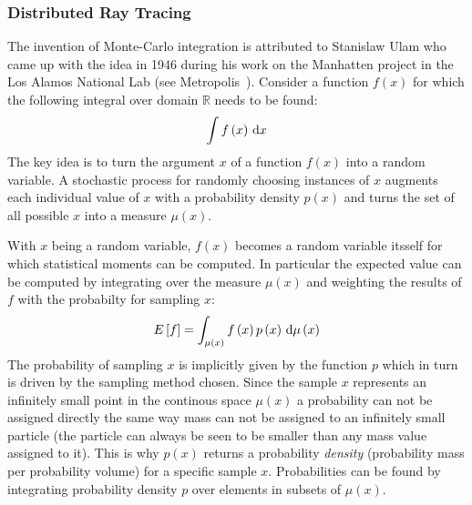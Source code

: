 \subsubsection*{Distributed Ray Tracing}

The invention of Monte-Carlo integration is attributed to Stanislaw Ulam who came up with the idea in 1946 during his work on the Manhatten project in the Los Alamos National Lab (see Metropolis~\cite{Metropolis49, Metropolis87}). Consider a function $f\left(x\right)$ for which the following integral over domain $\mathbb{R}$ needs to be found:
\begin{align}
\int f\left(x\right)\,\mathrm{d} x
\label{eq:mc_integral_1}
\end{align}
The key idea is to turn the argument $x$ of a function $f(x)$ into a random variable. A stochastic process for randomly choosing instances of $x$ augments each individual value of $x$ with a probability density $p(x)$ and turns the set of all possible $x$ into a measure $\mu(x)$.

With $x$ being a random variable, $f\left(x\right)$ becomes a random variable itsself for which statistical moments can be computed. In particular the expected value can be computed by integrating over the measure $\mu(x)$ and weighting the results of $f$ with the probabilty for sampling $x$:
\begin{align}
E\left[f\right] = \int_{\mu\left(x\right)} f\left(x\right)p\left(x\right)\,\mathrm{d}\mu\left(x\right)
\end{align}
The probability of sampling $x$ is implicitly given by the function $p$ which in turn is driven by the sampling method chosen. Since the sample $x$ represents an infinitely small point in the continous space $\mu\left(x\right)$ a probability can not be assigned directly the same way mass can not be assigned to an infinitely small particle (the particle can always be seen to be smaller than any mass value assigned to it). This is why $p(x)$ returns a probability \emph{density} (probability mass per probability volume) for a specific sample $x$. Probabilities can be found by integrating probability density $p$ over elements in subsets of $\mu\left(x\right)$.

